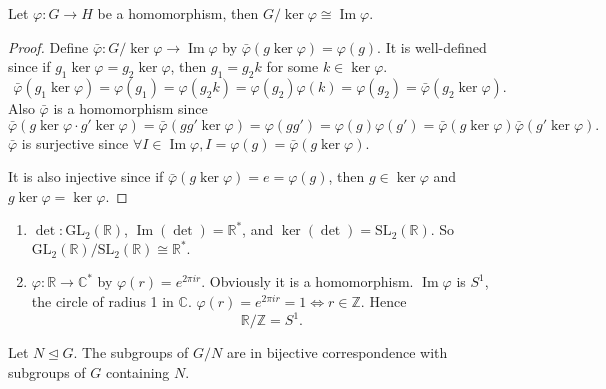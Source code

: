\documentclass[10pt]{article}
\DeclareMathOperator{\im}{Im}
\def\ltrigeq{\trianglelefteq}
\begin{document}
    \begin{theorem}\label{thm:1st isom thm}
        Let $ \varphi:G\to H $ be a homomorphism, then $ G/\ker \varphi \cong \im \varphi $.
    \end{theorem}
    \begin{proof}
        Define $\bar{\varphi}: G/ \ker \varphi\to \im \varphi $ by $ \bar{\varphi}(g \ker \varphi)=\varphi(g) $. It is well-defined since if $ g_1 \ker \varphi=g_2 \ker \varphi $, then $ g_1=g_2k $ for some $k\in \ker \varphi$.
        \[
            \bar{\varphi}(g_1 \ker \varphi)=\varphi(g_1)=\varphi(g_2 k)=\varphi(g_2)\varphi(k)=\varphi(g_2)=\bar{\varphi}(g_2 \ker \varphi)
        .\]
        Also $ \bar{\varphi} $ is a homomorphism since 
        \[
            \bar{\varphi}(g \ker \varphi \cdot g' \ker \varphi)=\bar{\varphi}(gg' \ker \varphi)=\varphi(gg')=\varphi(g)\varphi(g')=\bar{\varphi}(g \ker \varphi) \bar{\varphi}(g '\ker \varphi)
        .\]
        $ \bar{\varphi} $ is surjective since $ \forall I\in \im \varphi, I=\varphi(g)=\bar{\varphi}(g \ker \varphi). $

        It is also injective since if $ \bar{\varphi}(g \ker \varphi)=e=\varphi(g) $, then $ g\in \ker \varphi $ and $ g \ker \varphi = \ker \varphi $.
    \end{proof}
    \begin{example}
        \begin{enumerate}
            \item $ \det : \text{GL}_2( \mathbb{R} ) $, $ \im (\det )=\mathbb{R}^* $, and $ \ker (\det )=\text{SL}_2(\mathbb{R} ) $. So $ \text{GL}_2( \mathbb{R})/ \text{SL}_2( \mathbb{R}) \cong \mathbb{R}^*.$
            \item $ \varphi: \mathbb{R} \to \mathbb{C}^* $ by $ \varphi(r)=e^{2\pi ir} $. Obviously it is a homomorphism. $ \im \varphi $ is $S^1$, the circle of radius 1 in $\mathbb{C}$. $ \varphi(r)=e^{2\pi ir}=1 \Leftrightarrow r\in \mathbb{Z} $. Hence 
            \[
                \mathbb{R}/\mathbb{Z}=S^1
            .\]
        \end{enumerate}
    \end{example}
    \begin{theorem}\label{thm:Correspondence theorem}
        Let $ N \ltrigeq G $. The subgroups of $G/N$ are in bijective correspondence with subgroups of $G$ containing $N$.
    \end{theorem}
\end{document}
